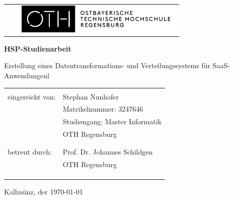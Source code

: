 
\thispagestyle{empty}


\begin{center}

\begin{tabular}{cp{.2cm}c}
 &  & \includegraphics [height=1.4cm]{Bilder/Titel/OTH_Logo_3line_pos_b.png}%
\end{tabular}

\vspace{4cm}



\noindent 
\textbf{\Huge{HSP-Studienarbeit}}

\vspace{1.5cm}

\noindent 
{\Large{Erstellung eines Datentransformations- und Verteilungssystems für SaaS-Anwendungenl}}


\vspace{3cm}

\begin{tabular}{ll}
\tabularnewline
\tabularnewline
eingereicht von:\hspace{1cm} & Stephan Nunhofer\tabularnewline
 & Matrikelnummer: 3247646\tabularnewline
 & Studiengang: Master Informatik\tabularnewline
 & OTH Regensburg\tabularnewline
 & \tabularnewline
 & \tabularnewline
betreut durch: & Prof. Dr. Johannes Schildgen\tabularnewline
 & OTH Regensburg\tabularnewline
 & \tabularnewline
 & \tabularnewline
 & \tabularnewline
 
\end{tabular}

\end{center}
\begin{center}
Kallmünz, der \today
\end{center}

\thispagestyle{empty}

